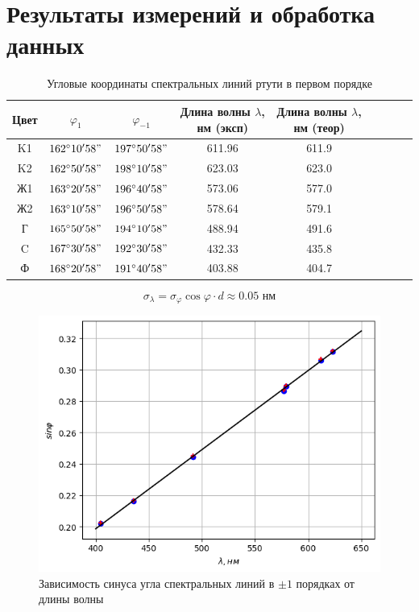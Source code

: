 \section*{Результаты измерений и обработка данных}

\begin{table}[h!]
    \centering
    \begin{tabular}{|c|c|c|c|c|c|c|c|c|}
        \hline
        Цвет & $\varphi_{1}$ & $\varphi_{-1}$ & Длина волны $\lambda$, нм (эксп) & Длина волны $\lambda$, нм (теор) \\\hline
        K1   & $162^{\circ}10'58"$ & $197^{\circ}50'58"$ & 611.96 & 611.9 \\\hline
        K2   & $162^{\circ}50'58"$ & $198^{\circ}10'58"$ & 623.03 & 623.0 \\\hline
        Ж1   & $163^{\circ}20'58"$ & $196^{\circ}40'58"$ & 573.06 & 577.0 \\\hline
        Ж2   & $163^{\circ}10'58"$ & $196^{\circ}50'58"$ & 578.64 & 579.1 \\\hline
        Г    & $165^{\circ}50'58"$ & $194^{\circ}10'58"$ & 488.94 & 491.6 \\\hline
        C    & $167^{\circ}30'58"$ & $192^{\circ}30'58"$ & 432.33 & 435.8 \\\hline
        Ф    & $168^{\circ}20'58"$ & $191^{\circ}40'58"$ & 403.88 & 404.7 \\\hline
    \end{tabular}
    \caption{Угловые координаты спектральных линий ртути в первом порядке}
\end{table}

$$\sigma_{\lambda} = \sigma_{\varphi} \cos\varphi \cdot d \approx 0.05 \text{ нм}$$

\newpage
\begin{figure}[h!]
    \centering
    \includegraphics[width=12cm]{images/plot1.png}
    \caption{Зависимость синуса угла спектральных линий в $\pm 1$ порядках от длины волны}
\end{figure}

